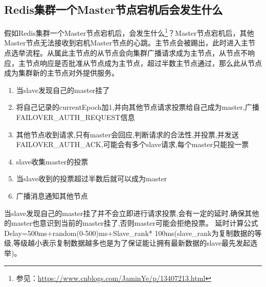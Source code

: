 \documentclass[../../../interview-questions.tex]{subfiles}
\begin{document}
\subsection{Redis集群一个Master节点宕机后会发生什么}

假如Redis集群一个Master节点宕机后，会发生什么\footnote{参见：\url{https://www.cnblogs.com/JaminYe/p/13407213.html}}？Master节点宕机后，其他Master节点无法接收到宕机Master节点的心跳。主节点会被踢出，此时进入主节点选举流程。从属此主节点的从节点会向集群广播请求成为主节点，从节点不响应，主节点响应是否批准从节点成为主节点，超过半数主节点通过，那么此从节点成为集群新的主节点对外提供服务。

\begin{enumerate}
    \item {当slave发现自己的master挂了}
    \item {将自己记录的currentEpoch加1,并向其他节点请求投票给自己成为master,广播FAILOVER\_AUTH\_REQUEST信息}
    \item {其他节点收到请求,只有master会回应,判断请求的合法性,并投票,并发送FAILOVER\_AUTH\_ACK,可能会有多个slave请求,每个master只能投一票}
    \item {slave收集master的投票}
    \item {当slave收到的投票超过半数后就可以成为master}
    \item {广播消息通知其他节点}
\end{enumerate}

当slave发现自己的master挂了并不会立即进行请求投票,会有一定的延时,确保其他的master也意识到当前的master挂了,否则master可能会拒绝投票。
延时计算公式Delay=500ms+random(0-500)ms+Slave\_rank* 100ms(slave\_rank为复制数据的等级,等级越小表示复制数据越多也是为了保证能让拥有最新数据的slave最先发起选举)。
\end{document}
